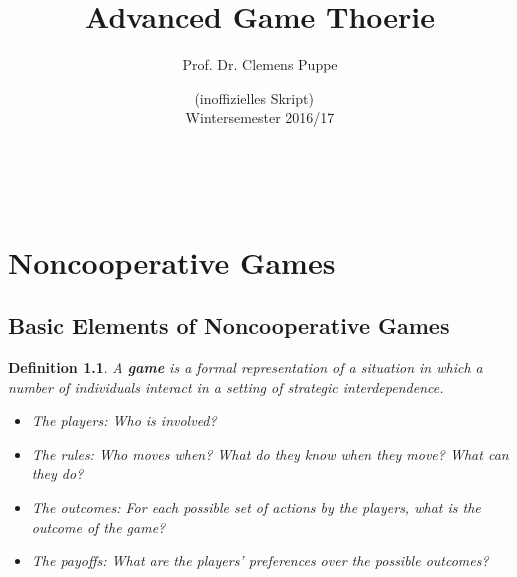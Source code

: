 \documentclass[12pt]{extreport} %
\title{Advanced Game Thoerie}
\author{Prof. Dr. Clemens Puppe}
\date{(inoffizielles Skript) ~\vspace{0.2cm} \\ Wintersemester 2016/17}
\makeatletter
\theoremstyle{named}
\theoremstyle{itshape}
\newtheorem*{definition}{Definition}
\theoremstyle{normal}
\def\maketitle{ \begin{titlepage} 
			~\vspace{3cm} 
		\begin{center} {\Huge \@title} \end{center} 
	 		\vspace*{1cm} 
	 	\begin{center} {\large \@author} \end{center} 
	 	\begin{center} \@date \end{center} 
	 		\vspace*{7cm} 
	 	\begin{center} \@publishers \end{center} 
	 		\vfill 
	\end{titlepage} }
\makeatother
\begin{document}
\begin{titlepage}
	\maketitle
	\thispagestyle{empty}
\end{titlepage}
	
\tableofcontents
\thispagestyle{empty} 
  
\chapter{Noncooperative Games}

\section{Basic Elements of Noncooperative Games}


\begin{definition}
	A \textbf{game} is a formal representation of a situation in which a number of individuals interact in a setting of strategic interdependence.
	
	\begin{itemize}
		\item The players: Who is involved?
		\item The rules: Who moves when? What do they know when they move? What can they do?
		\item The outcomes: For each possible set of actions by the players, what is the outcome of the game?
		\item The payoffs: What are the players' preferences over the possible outcomes?
	\end{itemize} 
\end{definition} 
\end{document}
